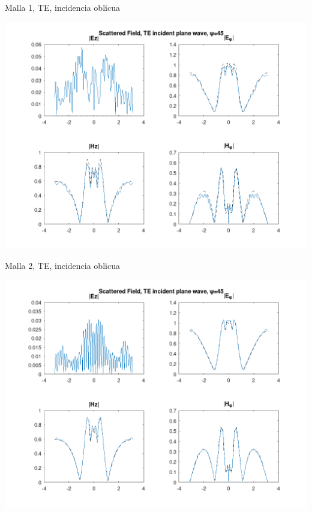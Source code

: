 \documentclass[smaller,xcolor=table,dvipsnames]{beamer}
\begin{document}

\begin{frame}{Malla 1, TE, incidencia oblicua}

\includegraphics[width=0.95\linewidth]{pec_y_malla_gorda_45_TE/NF.png}
  
\end{frame}
  

\begin{frame}{Malla 2, TE, incidencia oblicua}

\includegraphics[width=0.95\linewidth]{pec_y_malla_fina_45_TE/NF.png}
  
\end{frame}
  
\end{document}
